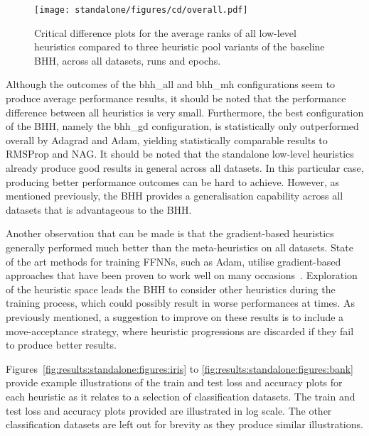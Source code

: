 \begin{figure}[htb]
      \centering
      \texttt{[image: standalone/figures/cd/overall.pdf]}
      \caption{Critical difference plots for the average ranks of all low-level heuristics compared to three heuristic pool variants of the baseline \acs{BHH}, across all datasets, runs and epochs.}
      \label{fig:results:standalone:descriptive:cd}
\end{figure}

Although the outcomes of the bhh\_all and bhh\_mh configurations seem to produce average performance results, it should be noted that the performance difference between all heuristics is very small. Furthermore, the best configuration of the \acs{BHH}, namely the bhh\_gd configuration, is statistically only outperformed overall by \acs{Adagrad} and \acs{Adam}, yielding statistically comparable results to \acs{RMSProp} and \acs{NAG}. It should be noted that the standalone low-level  heuristics already produce good results in general across all datasets. In this particular case, producing better performance outcomes can be hard to achieve. However, as mentioned previously, the \acs{BHH} provides a generalisation capability across all datasets that is advantageous to the \acs{BHH}.

Another observation that can be made is that the gradient-based heuristics generally performed much better than the meta-heuristics on all datasets. State of the art methods for training \acp{FFNN}, such as \acs{Adam}, utilise gradient-based approaches that have been proven to work well on many occasions~\cite{ref:kingma:2014}. Exploration of the heuristic space leads the \acs{BHH} to consider other heuristics during the training process, which could possibly result in worse performances at times. As previously mentioned, a suggestion to improve on these results is to include a move-acceptance strategy, where heuristic progressions are discarded if they fail to produce better results.

Figures~\ref{fig:results:standalone:figures:iris} to \ref{fig:results:standalone:figures:bank} provide example illustrations of the train and test loss and accuracy plots for each heuristic as it relates to a selection of classification datasets. The train and test loss and accuracy plots provided are illustrated in log scale. The other classification datasets are left out for brevity as they produce similar illustrations.


